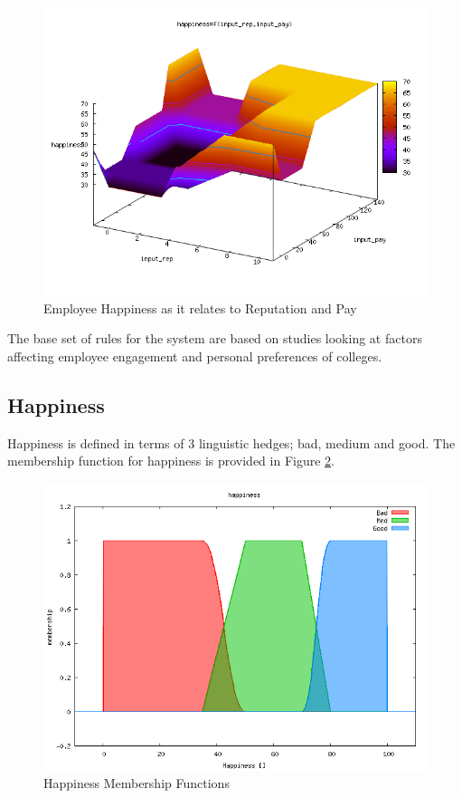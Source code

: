 \documentclass[12pt,fleqn,reqno,letterpaper]{article}
\begin{document}
\begin{figure}[H]
  \centering
  \includegraphics[scale=0.5,natwidth=640,natheight=480]{fig/baseline_input_rep_input_pay_happiness.png}
  \caption{Employee Happiness as it relates to Reputation and Pay}
  \label{fig:RP}
\end{figure}

The base set of rules for the system are based on studies looking at factors affecting employee engagement and personal preferences of colleges.

\subsection{Happiness}
\label{sec:happiness}

Happiness is defined in terms of 3 linguistic hedges; bad, medium and good. The membership function for happiness is provided in Figure \ref{fig:HAPPINESS-MF}.

\begin{figure}[H]
  \centering
  \includegraphics[scale=0.5,natwidth=640,natheight=480]{fig/happiness.png}
  \caption{Happiness Membership Functions}
  \label{fig:HAPPINESS-MF}
\end{figure}
\end{document}
